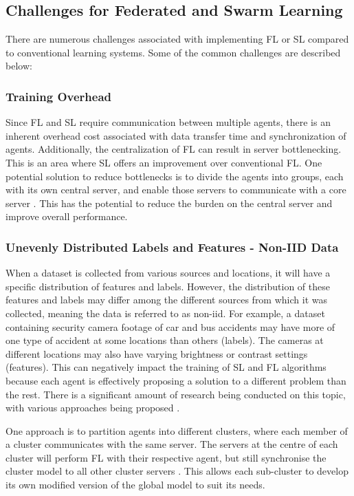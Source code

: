 \subsection{Challenges for Federated and Swarm Learning}
There are numerous challenges associated with implementing FL or SL compared to conventional learning systems. Some of the common challenges are described below:

\subsubsection{Training Overhead}
Since FL and SL require communication between multiple agents, there is an inherent overhead cost associated with data transfer time and synchronization of agents. Additionally, the centralization of FL can result in server bottlenecking. This is an area where SL offers an improvement over conventional FL. One potential solution to reduce bottlenecks is to divide the agents into groups, each with its own central server, and enable those servers to communicate with a core server \cite{multi_center_fed_learning}. This has the potential to reduce the burden on the central server and improve overall performance.

\subsubsection{Unevenly Distributed Labels and Features - Non-IID Data}
When a dataset is collected from various sources and locations, it will have a specific distribution of features and labels. However, the distribution of these features and labels may differ among the different sources from which it was collected, meaning the data is referred to as non-iid. For example, a dataset containing security camera footage of car and bus accidents may have more of one type of accident at some locations than others (labels). The cameras at different locations may also have varying brightness or contrast settings (features). This can negatively impact the training of SL and FL algorithms \cite{noniid_bad} because each agent is effectively proposing a solution to a different problem than the rest. There is a significant amount of research being conducted on this topic, with various approaches being proposed \cite{survey_noniid}.

One approach is to partition agents into different clusters, where each member of a cluster communicates with the same server. The servers at the centre of each cluster will perform FL with their respective agent, but still synchronise the cluster model to all other cluster servers \cite{multi_center_fed_learning}. This allows each sub-cluster to develop its own modified version of the global model to suit its needs.

